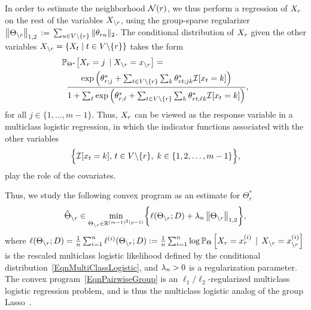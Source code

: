 In order to estimate the neighborhood $\mathcal{N}(r)$, we thus perform a regression of $X_{r}$ on the rest of the variables $X_{\backslash r}$, using the group-sparse regularizer $\left\|\Theta_{\backslash r}\right\|_{1,2} \, := \, \sum_{u \in V \backslash \{r\}} \|\theta_{r u}\|_2$. The conditional distribution of $X_{r}$ given the other variables $X_{\backslash r} = \{X_{t}\;|\; t \in V \backslash \{r\}\}$ takes the form
\begin{align}
\label{EqnMultiClassLogistic}
\nonumber & \mathbb{P}_{\Theta^*} \big[X_{r} = j \, \mid X_{\backslash r} = x_{\backslash r}\big] = \\
& \;\; \frac{\exp\left(\theta_{r;j}^* + \sum_{t \in V\backslash \{r\}} \sum_{k} \theta^*_{r t;jk} \mathcal{I}[x_t = k]\right)} {1+\sum_{\ell}\exp\left(\theta_{r;\ell}^* + \sum_{t \in V\backslash \{r\}} \sum_{k} \theta^*_{r t;\ell k} \mathcal{I}[x_t = k]\right)},
\end{align}
for all $j \in \{1,\hdots,m-1\}$. Thus, $X_{r}$ can be viewed as the response variable in a multiclass
logistic regression, in which the indicator functions associated with
the other variables
\begin{equation*}
\Big\{\mathcal{I}[x_t = k] ,\,t \in V \backslash \{r\}, \; k\in \{1, 2, \ldots,
m-1\}\Big\},
\end{equation*}
play the role of the covariates.

Thus, we study the following convex program as an estimate for $\Theta^*_r$
\begin{equation}
\label{EqnPairwiseGroup}
\hat{\Theta}_{\backslash r} \in \min_{\Theta_{\backslash r} \in \mathbb{R}^{(m-1)^2(p-1)}} \biggr\{ \ell(\Theta_{\backslash r}; D) +
	\lambda_n \left\|\Theta_{\backslash r}\right\|_{1,2}
	\biggr\},
\end{equation}
where $\ell(\Theta_{\backslash r}; D) = \frac{1}{n} \sum_{i=1}^n \ell^{(i)}(\Theta_{\backslash r}; D) :=
\frac{1}{n} \sum_{i=1}^n \log \mathbb{P}_{\Theta}
\left[X_{r} = x^{(i)}_{r} \, \mid \, X_{\backslash r} = x^{(i)}_{\backslash r} \right]$
is the rescaled multiclass logistic likelihood defined by the conditional distribution~\eqref{EqnMultiClassLogistic}, and
$\lambda_n > 0$ is a regularization parameter. The convex program~\eqref{EqnPairwiseGroup} is an $\ell_1/\ell_2$-regularized multiclass logistic regression problem, and is thus the multiclass logistic analog of the group Lasso~\citep{YuaLi06}.

